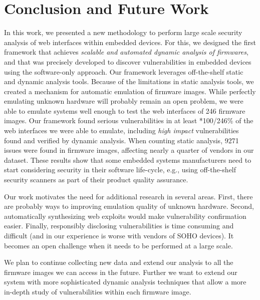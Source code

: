 \documentclass[conference]{./templates/ndss/IEEEtran}
\newcounter{t0d0_counter}
\newcounter{pr00f_counter}
\newcommand\printpercent[2]{\the\numexpr#1*100/#2\%}
\newcommand{\CountFirmwareEmulatedWebServerStarted}{246}
\newcommand{\CountFirmwareDynVulnTotal}{58}
\newcommand{\CountVulnsConclusion}{9271}
\begin{document}
\section{Conclusion and Future Work}
\label{sec:conclusion}






In this work, we presented a new methodology to perform large scale
security analysis of web interfaces within embedded devices.  
For this, we designed the first framework that achieves \emph{scalable and automated 
dynamic analysis of firmwares}, and that was precisely developed to 
discover vulnerabilities in embedded devices using the software-only approach. 
Our framework leverages off-the-shelf static and 
dynamic analysis tools. Because of the limitations in static analysis tools, we
created a mechanism for automatic emulation of firmware images.  While
perfectly emulating unknown hardware will probably remain an open
problem, we were able to emulate systems well enough to test the web
interfaces of \CountFirmwareEmulatedWebServerStarted{} firmware
images. Our framework found serious vulnerabilities in at least 
\printpercent{\CountFirmwareDynVulnTotal}{\CountFirmwareEmulatedWebServerStarted} of the web interfaces we were able to emulate,  
including \CountDynVulnsTotalHigh{} \emph{high impact} vulnerabilities 
found and verified by dynamic analysis. 
When counting static analysis,
\CountVulnsConclusion{} issues were found in \countfirmwarestotal{} firmware images, affecting nearly a quarter of vendors in our dataset. 
These results show that some embedded systems manufacturers need to
start considering security in their software life-cycle, e.g.,
using off-the-shelf security scanners as part of their product quality assurance.


Our work motivates the need for additional research in several
areas. First, there are probably ways to improving emulation quality
of unknown hardware. Second, automatically synthesizing web exploits
would make vulnerability confirmation easier. Finally, responsibly
disclosing vulnerabilities is time consuming and difficult (and in our
experience is worse with vendors of SOHO devices). It becomes an open
challenge when it needs to be performed at a large scale.

We plan to continue collecting new data and extend our analysis to all
the firmware images we can access in the future.  Further we want to
extend our system with more sophisticated dynamic analysis techniques
that allow a more in-depth study of vulnerabilities within each
firmware image.  




\balance




\small{

}
\end{document}
